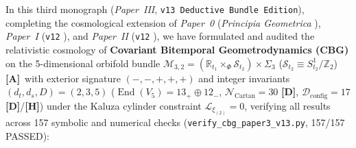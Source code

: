 \documentclass[11pt,a4paper]{article}
\newcommand{\catA}{\textbf{\textcolor{purple!80!black}{[A]}}}
\newcommand{\catD}{\textbf{\textcolor{blue!75!black}{[D]}}}
\newcommand{\catH}{\textbf{\textcolor{orange!85!black}{[H]}}}
\theoremstyle{plain}
\theoremstyle{definition}
\theoremstyle{remark}
\numberwithin{equation}{section}
\begin{document}
In this third monograph (\textit{Paper~III}, \texttt{v13 Deductive Bundle Edition}), completing the cosmological extension of \textit{Paper~0} (\textit{Principia Geometrica} \cite{jimenez2026_p0}), \textit{Paper~I} (\texttt{v12} \cite{jimenez2026a}), and \textit{Paper~II} (\texttt{v12} \cite{jimenez2026b}), we have formulated and audited the relativistic cosmology of \textbf{Covariant Bitemporal Geometrodynamics (CBG)} on the 5-dimensional orbifold bundle $\mathcal{M}_{3,2} = (\mathbb{R}_{t_1} \times_{\Phi} \mathcal{S}_{t_2}) \times \Sigma_3$ ($\mathcal{S}_{t_2} \equiv S^1_{t_2}/\mathbb{Z}_2$) \catA\ with exterior signature $(-,-,+,+,+)$ and integer invariants $(d_t, d_s, D) = (2, 3, 5)$ ($\operatorname{End}(V_5) = 13_+ \oplus 12_-$, $\mathcal{N}_{\text{Cartan}} = 30$ \catD, $\mathcal{D}_{\text{config}} = 17$ \catD/\catH) under the Kaluza cylinder constraint $\mathcal{L}_{\xi_{(2)}} = 0$, verifying all results across 157 symbolic and numerical checks (\allowbreak\texttt{verify\_cbg\_paper3\_v13.py}, 157/157 PASSED):
\end{document}
